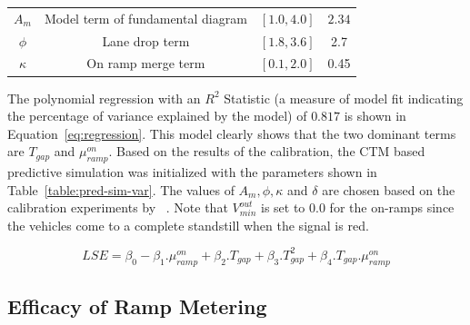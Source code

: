 \documentclass{wscpaperproc}
\theoremstyle{wsc}
\begin{document}
\begin{table}[!htbp]
\begin{tabular}{cclc}
$A_{m}$                                                                  & Model term of fundamental diagram                                                        & \multicolumn{1}{c}{$[1.0, 4.0]$}   & $2.34$                                                              \\
$\phi$                                                                   & Lane drop term                                                                           & $[1.8, 3.6]$                       & 2.7  \\
$\kappa$                                                                   & On ramp merge term                                                                           & $[0.1, 2.0]$                       & 0.45  \\ \hline                                                              
\end{tabular}
\end{table}

 

The polynomial regression  with an $R^2$ Statistic (a measure of model fit indicating the percentage of variance explained by the model) of $0.817$ is shown in Equation~\ref{eq:regression}. This model clearly shows that the two dominant terms are $T_{gap}$ and $\mu^{on}_{ramp}$. Based on the results of the calibration, the CTM based predictive simulation was initialized with the parameters shown in Table~\ref{table:pred-sim-var}.  The values of $A_m, \phi, \kappa$ and $\delta$ are chosen based on the calibration experiments by ~. Note that $V_{min}^{out}$ is set to $0.0$ for the on-ramps since the vehicles come to a complete standstill when the signal is red.

\begin{equation}
\label{eq:regression}
LSE=\beta_0-\beta_1.\mu^{on}_{ramp}+\beta_2.T_{gap}+\beta_3.T_{gap}^2+\beta_4.T_{gap}.\mu^{on}_{ramp}
\end{equation}

\subsection{Efficacy of Ramp Metering}
\label{subsec:results}
\end{document}
